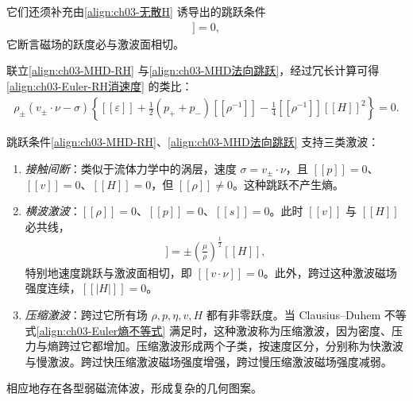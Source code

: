 ﻿\documentclass[../../main.tex]{subfiles}
\begin{document}
它们还须补充由\eqref{align:ch03-无散H} 诱导出的跳跃条件
\begin{align}
[\![H\cdot\nu]\!]=0,
\label{align:ch03-MHD法向跳跃}
\end{align}
它断言磁场的跃度必与激波面相切。

联立\eqref{align:ch03-MHD-RH} 与\eqref{align:ch03-MHD法向跳跃}，经过冗长计算可得\eqref{align:ch03-Euler-RH消速度} 的类比：
\begin{align}
\rho_{\pm}(v_{\pm}\cdot\nu-\sigma)\left\{[\![\varepsilon]\!]+\frac{1}{2}(p_{+}+p_{-})[\![\rho^{-1}]\!]-\frac{1}{4}[\![\rho^{-1}]\!][\![H]\!]^{2}\right\}=0.
\label{align:ch03-MHD-RH消速度}
\end{align}

跳跃条件\eqref{align:ch03-MHD-RH}、\eqref{align:ch03-MHD法向跳跃} 支持三类激波：
\begin{enumerate}
\item\label{item:ch03-MHD接触} \emph{接触间断}：类似于流体力学中的涡层，速度 $\sigma=v_{\pm}\cdot\nu$，且 $[\![p]\!]=0$、$[\![v]\!]=0$、$[\![H]\!]=0$，但 $[\![\rho]\!]\neq0$。这种跳跃不产生熵。
\item\label{item:ch03-MHD横波} \emph{横波激波}：$[\![\rho]\!]=0$、$[\![p]\!]=0$、$[\![s]\!]=0$。此时 $[\![v]\!]$ 与 $[\![H]\!]$ 必共线，
\begin{align}
[\![v]\!]=\pm\left(\frac{\mu}{\rho}\right)^{\frac{1}{2}}[\![H]\!],
\label{align:ch03-MHD横波关系}
\end{align}
特别地速度跳跃与激波面相切，即 $[\![v\cdot\nu]\!]=0$。此外，跨过这种激波磁场强度连续，$[\![|H|]\!]=0$。
\item\label{item:ch03-MHD压缩} \emph{压缩激波}：跨过它所有场 $\rho,p,\eta,v,H$ 都有非零跃度。当 Clausius--Duhem 不等式\eqref{align:ch03-Euler熵不等式} 满足时，这种激波称为压缩激波，因为密度、压力与熵跨过它都增加。压缩激波形成两个子类，按速度区分，分别称为快激波与慢激波。跨过快压缩激波磁场强度增强，跨过慢压缩激波磁场强度减弱。
\end{enumerate}

相应地存在各型弱磁流体波，形成复杂的几何图案。
\end{document}
